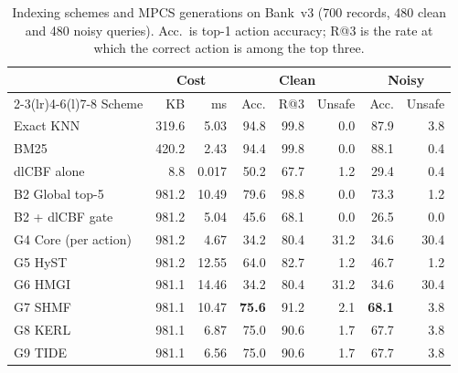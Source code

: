 \documentclass[12pt,a4paper,oneside]{report}
\begin{document}
\begin{table}[H]
\centering
\caption{Indexing schemes and MPCS generations on Bank~v3 (700 records, 480 clean and 480 noisy queries). Acc.\ is top-1 action accuracy; R@3 is the rate at which the correct action is among the top three.}
\label{tab:master}
\small
\setlength{\tabcolsep}{4.5pt}
\begin{tabular}{@{}lrrrrrrr@{}}
\toprule
& \multicolumn{2}{c}{Cost} & \multicolumn{3}{c}{Clean} & \multicolumn{2}{c}{Noisy}\\
\cmidrule(lr){2-3}\cmidrule(lr){4-6}\cmidrule(l){7-8}
Scheme & KB & ms & Acc. & R@3 & Unsafe & Acc. & Unsafe\\
\midrule
Exact KNN & 319.6 & 5.03 & 94.8 & 99.8 & 0.0 & 87.9 & 3.8\\
BM25 & 420.2 & 2.43 & 94.4 & 99.8 & 0.0 & 88.1 & 0.4\\
dlCBF alone & 8.8 & 0.017 & 50.2 & 67.7 & 1.2 & 29.4 & 0.4\\
\midrule
B2 Global top-5 & 981.2 & 10.49 & 79.6 & 98.8 & 0.0 & 73.3 & 1.2\\
B2 + dlCBF gate & 981.2 & 5.04 & 45.6 & 68.1 & 0.0 & 26.5 & 0.0\\
\midrule
G4 Core (per action) & 981.2 & 4.67 & 34.2 & 80.4 & 31.2 & 34.6 & 30.4\\
G5 HyST & 981.2 & 12.55 & 64.0 & 82.7 & 1.2 & 46.7 & 1.2\\
G6 HMGI & 981.1 & 14.46 & 34.2 & 80.4 & 31.2 & 34.6 & 30.4\\
G7 SHMF & 981.1 & 10.47 & \textbf{75.6} & 91.2 & 2.1 & \textbf{68.1} & 3.8\\
G8 KERL & 981.1 & 6.87 & 75.0 & 90.6 & 1.7 & 67.7 & 3.8\\
G9 TIDE & 981.1 & 6.56 & 75.0 & 90.6 & 1.7 & 67.7 & 3.8\\
\bottomrule
\end{tabular}
\end{table}
\end{document}
